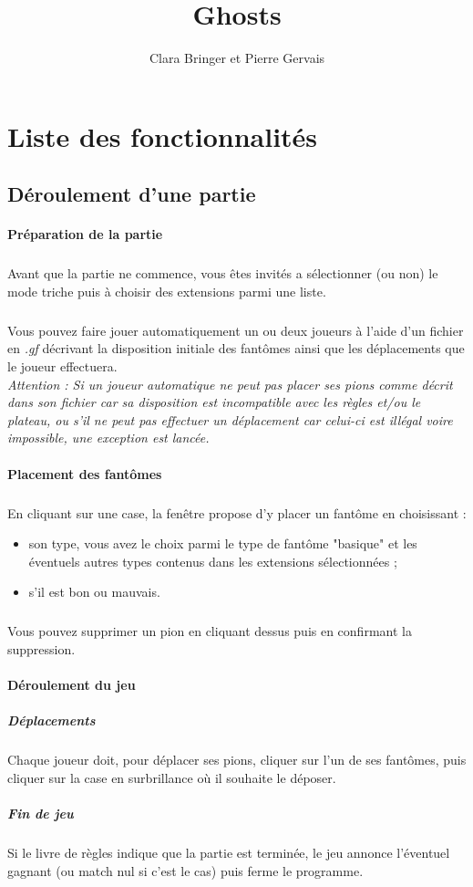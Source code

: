 \documentclass[]{report}
\title{Ghosts}
\author{Clara Bringer et Pierre Gervais}
\begin{document}
\maketitle

\section{Liste des fonctionnalités}
\subsection{Déroulement d'une partie}
\paragraph{Préparation de la partie}
\subparagraph*{}
Avant que la partie ne commence, vous êtes invités a sélectionner (ou non) le mode triche puis à choisir des extensions parmi une liste.
\subparagraph*{}
Vous pouvez faire jouer automatiquement un ou deux joueurs à l'aide d'un fichier en \textit{.gf} décrivant la disposition initiale des fantômes ainsi que les déplacements que le joueur effectuera.\\
\emph{Attention : Si un joueur automatique ne peut pas placer ses pions comme décrit dans son fichier car sa disposition est incompatible avec les règles et/ou le plateau, ou s'il ne peut pas effectuer un déplacement car celui-ci est illégal voire impossible, une exception est lancée.}

\paragraph{Placement des fantômes}
\subparagraph*{}
En cliquant sur une case, la fenêtre propose d'y placer un fantôme en choisissant :
\begin{itemize}
	\item son type, vous avez le choix parmi le type de fantôme "basique" et les éventuels autres types contenus dans les extensions sélectionnées ;
	\item s'il est bon ou mauvais.
\end{itemize}
\subparagraph*{}
Vous pouvez supprimer un pion en cliquant dessus puis en confirmant la suppression.

\paragraph{Déroulement du jeu}
\subparagraph{Déplacements}
Chaque joueur doit, pour déplacer ses pions, cliquer sur l'un de ses fantômes, puis cliquer sur la case en surbrillance où il souhaite le déposer.
\subparagraph{Fin de jeu}
Si le livre de règles indique que la partie est terminée, le jeu annonce l'éventuel gagnant (ou match nul si c'est le cas) puis ferme le programme.
\end{document}
